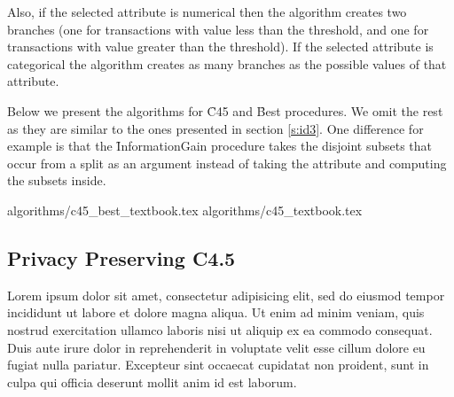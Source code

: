 Also, if the selected attribute is numerical then the algorithm creates two branches (one for transactions with value less than the threshold, and one for transactions with value greater than the threshold).
If the selected attribute is categorical the algorithm creates as many branches as the possible values of that attribute.

Below we present the algorithms for \f{C45} and \f{Best} procedures.
We omit the rest as they are similar to the ones presented in section \ref{s:id3}.
One difference for example is that the \f{InformationGain} procedure takes the disjoint subsets that occur from a split as an argument instead of taking the attribute and computing the subsets inside.

{algorithms/c45_best_textbook.tex}
{algorithms/c45_textbook.tex}

\subsection{Privacy Preserving C4.5}\label{s:pp-c45}
Lorem ipsum dolor sit amet, consectetur adipisicing elit, sed do eiusmod tempor incididunt ut labore et dolore magna aliqua. Ut enim ad minim veniam, quis nostrud exercitation ullamco laboris nisi ut aliquip ex ea commodo consequat. Duis aute irure dolor in reprehenderit in voluptate velit esse cillum dolore eu fugiat nulla pariatur. Excepteur sint occaecat cupidatat non proident, sunt in culpa qui officia deserunt mollit anim id est laborum.


